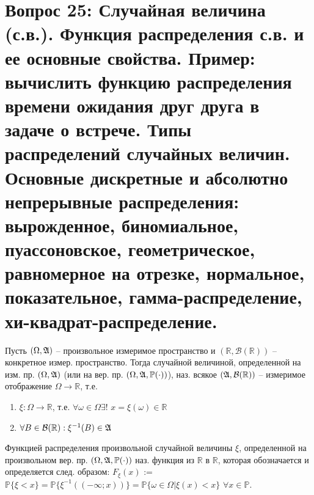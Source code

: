 \section{Вопрос 25: Случайная величина (с.в.). Функция распределения с.в. и ее основные свойства. Пример: вычислить функцию распределения времени ожидания друг друга в задаче о встрече. Типы распределений случайных величин. Основные дискретные и абсолютно непрерывные распределения: вырожденное, биномиальное, пуассоновское, геометрическое, равномерное на отрезке, нормальное, показательное, гамма-распределение, хи-квадрат-распределение.}

\begin{defs}
	Пусть $(\Omega, \mathfrak{A})$ -- произвольное измеримое пространство и $(\mathbb{R}, \mathcal{B}(\mathbb{R}))$ -- конкретное измер. пространство.
	Тогда случайной величиной, определенной на изм. пр. $(\Omega, \mathfrak{A})$ (или на вер. пр. $(\Omega, \mathfrak{A}, \mathbb{P}(\cdot))$), наз. всякое 
	$(\mathfrak{A}, \mathcal{B}(\mathbb{R}))$ -- измеримое отображение $\Omega \to \mathbb{R}$, т.е.
	\begin{enumerate}
	\item $\xi:\Omega \to \mathbb{R}$, т.е. $\forall \omega \in \Omega \exists$! $x=\xi(\omega) \in \mathbb{R}$ 
	\item $\forall B \in \mathcal{B}(\mathbb{R}): \xi^{-1}(B)\in \mathfrak{A}$
	\end{enumerate}
\end{defs}

\begin{defs}
	Функцией распределения произвольной случайной величины $\xi$, определенной на произвольном вер. пр.  $(\Omega, \mathfrak{A}, \mathbb{P}(\cdot))$ наз. функция из $\mathbb{R}$ в $\mathbb{R}$,
	которая обозначается и определяется след. образом:
	$F_{\xi}(x)$ := $\mathbb{P} \{ \xi < x \} = \mathbb{P}\{\xi^{-1}((-\infty;x))\} = \mathbb{P}\{\omega \in \Omega| \xi(x) < x\}$ $\forall x \in \mathbb{P}$.
\end{defs}

